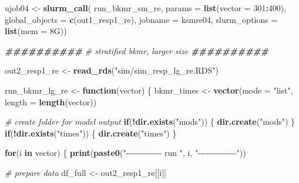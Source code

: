\documentclass[12pt, twoside]{amherstthesis}
\newenvironment{Shaded}{\begin{snugshade}}{\end{snugshade}}
\newcommand{\AttributeTok}[1]{\textcolor[rgb]{0.13,0.29,0.53}{#1}}
\newcommand{\CommentTok}[1]{\textcolor[rgb]{0.56,0.35,0.01}{\textit{#1}}}
\newcommand{\ControlFlowTok}[1]{\textcolor[rgb]{0.13,0.29,0.53}{\textbf{#1}}}
\newcommand{\DecValTok}[1]{\textcolor[rgb]{0.00,0.00,0.81}{#1}}
\newcommand{\DocumentationTok}[1]{\textcolor[rgb]{0.56,0.35,0.01}{\textbf{\textit{#1}}}}
\newcommand{\FunctionTok}[1]{\textcolor[rgb]{0.13,0.29,0.53}{\textbf{#1}}}
\newcommand{\NormalTok}[1]{#1}
\newcommand{\OtherTok}[1]{\textcolor[rgb]{0.56,0.35,0.01}{#1}}
\newcommand{\SpecialCharTok}[1]{\textcolor[rgb]{0.81,0.36,0.00}{\textbf{#1}}}
\newcommand{\StringTok}[1]{\textcolor[rgb]{0.31,0.60,0.02}{#1}}
\begin{document}
\begin{Shaded}
\begin{Highlighting}[]
\NormalTok{ujob04 }\OtherTok{\textless{}{-}} \FunctionTok{slurm\_call}\NormalTok{(}
\NormalTok{  run\_bkmr\_sm\_re, }\AttributeTok{params =} \FunctionTok{list}\NormalTok{(}\AttributeTok{vector =} \DecValTok{301}\SpecialCharTok{:}\DecValTok{400}\NormalTok{),}
  \AttributeTok{global\_objects =} \FunctionTok{c}\NormalTok{(}\StringTok{\textquotesingle{}out1\_resp1\_re\textquotesingle{}}\NormalTok{),}
  \AttributeTok{jobname =} \StringTok{\textquotesingle{}ksmre04\textquotesingle{}}\NormalTok{,}
  \AttributeTok{slurm\_options =} \FunctionTok{list}\NormalTok{(}\AttributeTok{mem =} \StringTok{\textquotesingle{}8G\textquotesingle{}}\NormalTok{))}
\end{Highlighting}
\end{Shaded}
\normalsize

\scriptsize
\begin{Shaded}
\begin{Highlighting}[]
\DocumentationTok{\#\#\#\#\#\#\#\#\#\#}
\CommentTok{\# stratified bkmr, larger size}
\DocumentationTok{\#\#\#\#\#\#\#\#\#\#}

\NormalTok{out2\_resp1\_re }\OtherTok{\textless{}{-}} \FunctionTok{read\_rds}\NormalTok{(}\StringTok{"sim/sim\_resp\_lg\_re.RDS"}\NormalTok{)}

\NormalTok{run\_bkmr\_lg\_re }\OtherTok{\textless{}{-}} \ControlFlowTok{function}\NormalTok{(vector) \{}
\NormalTok{  bkmr\_times }\OtherTok{\textless{}{-}} \FunctionTok{vector}\NormalTok{(}\AttributeTok{mode =} \StringTok{"list"}\NormalTok{, }\AttributeTok{length =} \FunctionTok{length}\NormalTok{(vector))}
  
  \CommentTok{\# create folder for model output}
  \ControlFlowTok{if}\NormalTok{(}\SpecialCharTok{!}\FunctionTok{dir.exists}\NormalTok{(}\StringTok{"mods"}\NormalTok{)) \{}
    \FunctionTok{dir.create}\NormalTok{(}\StringTok{"mods"}\NormalTok{)}
\NormalTok{  \}}
  \ControlFlowTok{if}\NormalTok{(}\SpecialCharTok{!}\FunctionTok{dir.exists}\NormalTok{(}\StringTok{"times"}\NormalTok{)) \{}
    \FunctionTok{dir.create}\NormalTok{(}\StringTok{"times"}\NormalTok{)}
\NormalTok{  \}}
  
  \ControlFlowTok{for}\NormalTok{(i }\ControlFlowTok{in}\NormalTok{ vector) \{}
    \FunctionTok{print}\NormalTok{(}\FunctionTok{paste0}\NormalTok{(}\StringTok{"{-}{-}{-}{-}{-}{-}{-}{-}{-}{-}{-}{-}{-} run "}\NormalTok{, i, }\StringTok{"{-}{-}{-}{-}{-}{-}{-}{-}{-}{-}{-}{-}{-}{-}"}\NormalTok{))}
    
    \CommentTok{\# prepare data}
\NormalTok{    df\_full }\OtherTok{\textless{}{-}}\NormalTok{ out2\_resp1\_re[[i]]}
    

\end{Highlighting}
\end{Shaded}
\end{document}
